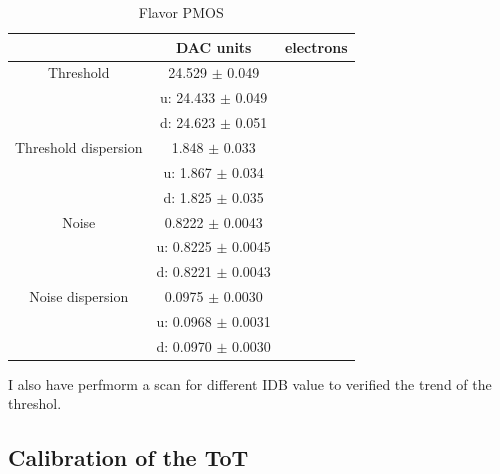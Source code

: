     
        \begin{table}
                \begin{center}
                \begin{tabular}{| c | c | c |}
                \hline
                 & DAC units & electrons \\
                \hline
                \hline
                Threshold        & 24.529 $\pm$ 0.049 & \\
                                 &u: 24.433 $\pm$ 0.049 & \\ 
                                 &d: 24.623 $\pm$ 0.051 &    \\      
                Threshold dispersion & 1.848 $\pm$ 0.033 &\\
                                 &u: 1.867 $\pm$ 0.034 & \\ 
                                 &d: 1.825 $\pm$ 0.035 &    \\ 
                Noise            & 0.8222 $\pm$ 0.0043 & \\
                                 &u: 0.8225 $\pm$ 0.0045 & \\ 
                                 &d: 0.8221 $\pm$ 0.0043 &    \\      
                Noise dispersion & 0.0975 $\pm$ 0.0030 &\\
                                 &u: 0.0968 $\pm$ 0.0031 & \\ 
                                 &d: 0.0970 $\pm$ 0.0030 &    \\ 
                \hline
                \end{tabular}
                \caption{Flavor PMOS}
                \label{tab:}
                \end{center}
        \end{table}        
            
    
    I also have perfmorm a scan for different IDB value to verified the trend of the threshol.
                   
        

    \subsection{Calibration of the ToT}    

